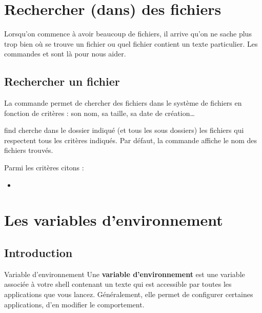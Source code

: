 \documentclass[a4paper,11pt]{style-esi/td}
\begin{document}
\entete
\titre
{}
\lastedit

\bigskip
\tableofcontents

\section{Rechercher (dans) des fichiers}

	Lorsqu'on commence à avoir beaucoup de fichiers,
	il arrive qu'on ne sache plus trop bien où se trouve un fichier
	ou quel fichier contient un texte particulier.
	Les commandes  et  sont là pour nous aider.

	\subsection{Rechercher un fichier}

		La commande  permet de chercher des fichiers
		dans le système de fichiers en fonction de critères : 
		son nom, sa taille, sa date de création\dots

		\begin{theorie}{find}
			cherche dans le dossier indiqué (et tous les sous dossiers)
			les fichiers qui respectent tous les critères indiqués.
			Par défaut, la commande affiche le nom des fichiers trouvés.

			Parmi les critères citons :
			\begin{itemize}
				\item {}
			\end{itemize}
        \end{theorie}
        
\section{Les variables d'environnement}  

	\subsection{Introduction}

		\begin{theorie}{Variable d'environnement}
			Une \textbf{variable d'environnement} 
			est une variable associée à votre shell 
			contenant un texte qui est accessible 
			par toutes les applications que vous lancez. 
			Généralement, elle permet de configurer certaines applications, 
			d'en modifier le comportement.
		\end{theorie}	
\end{document}
